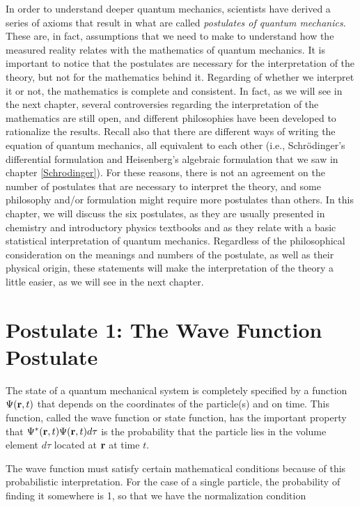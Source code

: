 \documentclass[
  9pt,
]{extbook}
\theoremstyle{definition}
\theoremstyle{definition}
\theoremstyle{definition}
\theoremstyle{remark}
\begin{document}
In order to understand deeper quantum mechanics, scientists have derived a series of axioms that result in what are called \emph{postulates of quantum mechanics}. These are, in fact, assumptions that we need to make to understand how the measured reality relates with the mathematics of quantum mechanics. It is important to notice that the postulates are necessary for the interpretation of the theory, but not for the mathematics behind it. Regarding of whether we interpret it or not, the mathematics is complete and consistent. In fact, as we will see in the next chapter, several controversies regarding the interpretation of the mathematics are still open, and different philosophies have been developed to rationalize the results. Recall also that there are different ways of writing the equation of quantum mechanics, all equivalent to each other (i.e., Schrödinger's differential formulation and Heisenberg's algebraic formulation that we saw in chapter \ref{Schrodinger}). For these reasons, there is not an agreement on the number of postulates that are necessary to interpret the theory, and some philosophy and/or formulation might require more postulates than others. In this chapter, we will discuss the six postulates, as they are usually presented in chemistry and introductory physics textbooks and as they relate with a basic statistical interpretation of quantum mechanics. Regardless of the philosophical consideration on the meanings and numbers of the postulate, as well as their physical origin, these statements will make the interpretation of the theory a little easier, as we will see in the next chapter.

\hypertarget{postulate-1-the-wave-function-postulate}{%
\section{Postulate 1: The Wave Function Postulate}\label{postulate-1-the-wave-function-postulate}}

The state of a quantum mechanical system is completely specified by a function \(\Psi({\bf r}, t)\) that depends on the coordinates of the particle(s) and on time. This function, called the wave function or state function, has the important property that \(\Psi^{*}({\bf r}, t)\Psi({\bf r}, t) d\tau\) is the probability that the particle lies in the volume element \(d\tau\) located at \({\bf r}\) at time \(t\).

The wave function must satisfy certain mathematical conditions because of this probabilistic interpretation. For the case of a single particle, the probability of finding it somewhere is 1, so that we have the normalization condition
\end{document}
